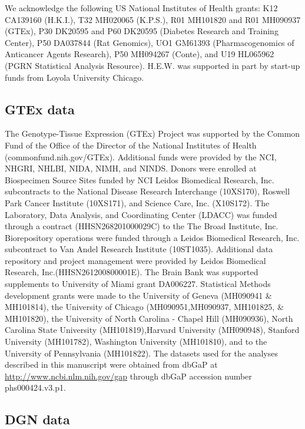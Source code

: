 \documentclass[]{article}
\begin{document}
We acknowledge the following US National Institutes of Health grants:
K12 CA139160 (H.K.I.), T32 MH020065 (K.P.S.), R01 MH101820 and R01
MH090937 (GTEx), P30 DK20595 and P60 DK20595 (Diabetes Research and
Training Center), P50 DA037844 (Rat Genomics), UO1 GM61393
(Pharmacogenomics of Anticancer Agents Research), P50 MH094267 (Conte),
and U19 HL065962 (PGRN Statistical Analysis Resource). H.E.W. was
supported in part by start-up funds from Loyola University Chicago.

\subsection{GTEx data}\label{gtex-data}

The Genotype-Tissue Expression (GTEx) Project was supported by the
Common Fund of the Office of the Director of the National Institutes of
Health (commonfund.nih.gov/GTEx). Additional funds were provided by the
NCI, NHGRI, NHLBI, NIDA, NIMH, and NINDS. Donors were enrolled at
Biospecimen Source Sites funded by NCI Leidos Biomedical Research, Inc.
subcontracts to the National Disease Research Interchange (10XS170),
Roswell Park Cancer Institute (10XS171), and Science Care, Inc.
(X10S172). The Laboratory, Data Analysis, and Coordinating Center
(LDACC) was funded through a contract (HHSN268201000029C) to the The
Broad Institute, Inc. Biorepository operations were funded through a
Leidos Biomedical Research, Inc. subcontract to Van Andel Research
Institute (10ST1035). Additional data repository and project management
were provided by Leidos Biomedical Research, Inc.(HHSN261200800001E).
The Brain Bank was supported supplements to University of Miami grant
DA006227. Statistical Methods development grants were made to the
University of Geneva (MH090941 \& MH101814), the University of Chicago
(MH090951,MH090937, MH101825, \& MH101820), the University of North
Carolina - Chapel Hill (MH090936), North Carolina State University
(MH101819),Harvard University (MH090948), Stanford University
(MH101782), Washington University (MH101810), and to the University of
Pennsylvania (MH101822). The datasets used for the analyses described in
this manuscript were obtained from dbGaP at
\url{http://www.ncbi.nlm.nih.gov/gap} through dbGaP accession number
phs000424.v3.p1.

\subsection{DGN data}\label{dgn-data}
\end{document}
